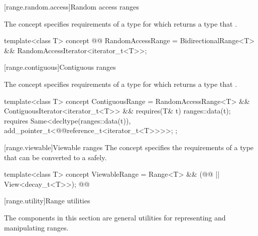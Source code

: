 {[range.random.access]{Random access ranges}

\pnum
The  concept specifies requirements of a
 type for which  returns a type that  
.

%
\begin{itemdecl}
template<class T>
concept @@ RandomAccessRange =
  BidirectionalRange<T> && RandomAccessIterator<iterator_t<T>>;
\end{itemdecl}

[range.contiguous]{Contiguous ranges}

\pnum
The  concept specifies requirements of a
 type for which  returns a type that  
.

%
\begin{itemdecl}
template<class T>
concept ContiguousRange =
  RandomAccessRange<T> && ContiguousIterator<iterator_t<T>> &&
  requires(T& t) {
    ranges::data(t);
    requires Same<decltype(ranges::data(t)), add_pointer_t<@@reference_t<iterator_t<T>>>>;
  };
\end{itemdecl}

[range.viewable]{Viewable ranges}
\pnum
The  concept specifies the requirements of a
 type that can be converted to a  safely.

%
\begin{itemdecl}
template<class T>
concept ViewableRange =
  Range<T> && (@@ || View<decay_t<T>>); @\oldtxt{// \seebelow}@
\end{itemdecl}

\begin{itemdescr}
\pnum
{}
\end{itemdescr}

[range.utility]{Range utilities}

\pnum
The components in this section are general utilities for representing and
manipulating ranges.

}
